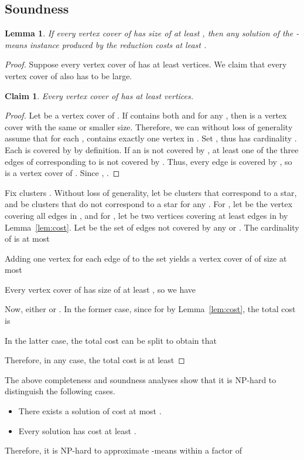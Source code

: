 \documentclass{scrartcl}
\newtheorem{lemma}[theorem]{Lemma}
\newtheorem{claim}[theorem]{Claim}
\begin{document}
\subsection{Soundness} \begin{lemma}
If every vertex cover of  has size of at least , then any solution of the -means instance produced by the reduction costs at least .
\end{lemma}
\begin{proof}
Suppose every vertex cover of  has at least  vertices. We claim that every vertex cover of  also has to be large. 
\begin{claim}
Every vertex cover of  has at least  vertices. 
\end{claim}
\begin{proof}
Let  be a vertex cover of . If  contains both  and  for any , 
then  is a vertex cover with the same or smaller size.
Therefore, we can without loss of generality assume that for each ,  contains exactly one vertex in . 
Set , thus  has cardinality . 
Each  is covered by  by definition. If an  is not covered by , at least one of the three edges of  corresponding to  is not covered by . 
Thus, every edge  is covered by , so  is a vertex cover of . Since , . 
\end{proof}



Fix  clusters . 
Without loss of generality, let  be clusters that correspond to a star, and  be clusters that do not correspond to a star for any . 
For , let  be the vertex covering all edges in , and for , let  be two vertices covering at least  edges in  by Lemma~\ref{lem:cost}. 
Let  be the set of edges not covered by any  or . 
The cardinality of  is at most 


Adding one vertex for each edge of  to the set  yields a vertex cover of  of size at most 

Every vertex cover of  has size of at least , so we have 

Now, either  or .
In the former case, since  for  by Lemma~\ref{lem:cost}, the total cost is 

In the latter case, the total cost can be split to obtain that  

Therefore, in any case, the total cost is at least 

\end{proof}

The above completeness and soundness analyses show that it is NP-hard to distinguish the following cases.
\begin{itemize}
\item There exists a solution of cost at most . 
\item Every solution has cost at least .
\end{itemize}
Therefore, it is NP-hard to approximate -means within a factor of
\end{document}
